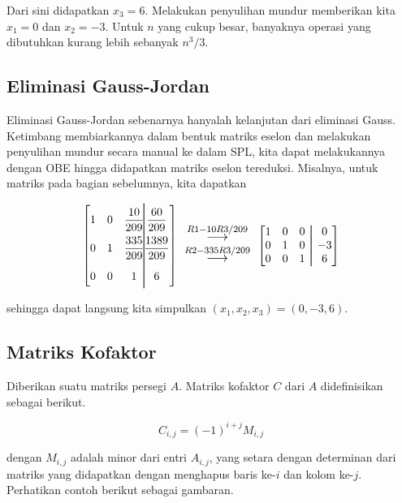 Dari sini didapatkan $x_3 = 6$. Melakukan penyulihan mundur memberikan kita $x_1 = 0$ dan $x_2 = -3$. Untuk $n$ yang cukup besar, banyaknya operasi yang dibutuhkan kurang lebih sebanyak $n^3/3$.

\subsection{Eliminasi Gauss-Jordan}

Eliminasi Gauss-Jordan sebenarnya hanyalah kelanjutan dari eliminasi Gauss. Ketimbang membiarkannya dalam bentuk matriks eselon dan melakukan penyulihan mundur secara manual ke dalam SPL, kita dapat melakukannya dengan OBE hingga didapatkan matriks eselon tereduksi. Misalnya, untuk matriks pada bagian sebelumnya, kita dapatkan

\[
    \begin{bmatrix}
        1 & 0 & \dfrac{10}{209}  & \text{\huge $\aug$} & \dfrac{60}{209}     \\
        0 & 1 & \dfrac{335}{209} & \text{\huge $\aug$} & \dfrac{1389}{209}   \\
        0 & 0 & 1 & \text{\huge $\aug$} & 6
    \end{bmatrix}
    \text{\large $\begin{array}{c}
        \stackrel{R1 - 10R3/209}{\longrightarrow} \\
        \stackrel{R2 - 335R3/209}{\longrightarrow} 
    \end{array}$}
    \begin{bmatrix}
        1 & 0 & 0 & \aug & 0  \\
        0 & 1 & 0 & \aug & -3 \\
        0 & 0 & 1 & \aug & 6
    \end{bmatrix}
\]

sehingga dapat langsung kita simpulkan $(x_1, x_2, x_3) = (0, -3, 6)$.

\subsection{Matriks Kofaktor}
Diberikan suatu matriks persegi $A$. Matriks kofaktor $C$ dari $A$ didefinisikan sebagai berikut.

\[ C_{i,j} = (-1)^{i+j} M_{i,j} \]

dengan $M_{i,j}$ adalah minor dari entri $A_{i,j}$, yang setara dengan determinan dari matriks yang didapatkan dengan menghapus baris ke-$i$ dan kolom ke-$j$. Perhatikan contoh berikut sebagai gambaran.

